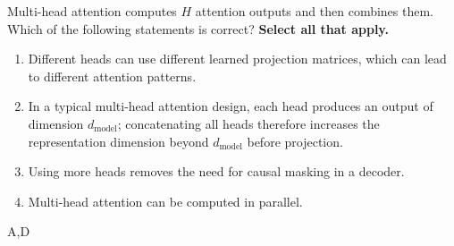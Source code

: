 

\question[4]
Multi-head attention computes \(H\) attention outputs and then combines them. Which of the following statements is correct? \textbf{Select all that apply.}
\begin{enumerate}
\item Different heads can use different learned projection matrices, which can lead to different attention patterns.
\item In a typical multi-head attention design, each head produces an output of dimension \(d_{\text{model}}\); concatenating all heads therefore increases the representation dimension beyond \(d_{\text{model}}\) before projection.
\item Using more heads removes the need for causal masking in a decoder.
\item Multi-head attention can be  computed in parallel.
\end{enumerate}
\begin{soln}
A,D
\end{soln}






